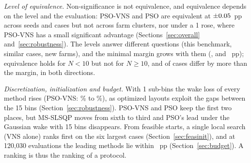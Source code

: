 \emph{Level of equivalence.} Non-significance is not equivalence, and equivalence depends on the level and the evaluation: PSO-VNS and PSO are equivalent at $\pm0.05$~pp across seeds and cases but not across farm clusters, nor under a 1\textdegree{} rose, where PSO-VNS has a small significant advantage (Sections~\ref{sec:overall} and~\ref{sec:robustness}). The levels answer different questions (this benchmark, similar cases, new farms), and the minimal margin grows with them (\NXEqSeedPSOVNSvsPSOMin, \NXEqCasePSOVNSvsPSOMin{} and \NXEqClustPSOVNSvsPSOMin~pp); equivalence holds for $N<10$ but not for $N\ge10$, and \NXHetBeyond{} of \NXHetN{} cases differ by more than the margin, in both directions.

\emph{Discretization, initialization and budget.} With 1\textdegree{} sub-bins the wake loss of every method rises (PSO-VNS: \NFLossPSOVNSFifteen\% to \NFLossPSOVNSOne\%), as optimized layouts exploit the gaps between the 15\textdegree{} bins (Section~\ref{sec:robustness}). PSO-VNS and PSO keep the first two places, but MS-SLSQP moves from sixth to third and PSO's lead under the Gaussian wake with 15\textdegree{} bins disappears. From feasible starts, a single local search (VNS alone) ranks first on the six largest cases (Section~\ref{sec:feasinit}), and at 120,030 evaluations the leading methods lie within \NBudCloseGapOneTwentyK~pp (Section~\ref{sec:budget}). A ranking is thus the ranking of a protocol.

